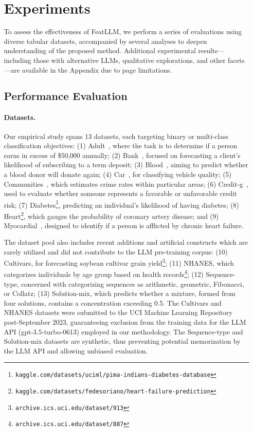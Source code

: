 \section{Experiments}
To assess the effectiveness of \textsf{FeatLLM}, we perform a series of evaluations using diverse tabular datasets, accompanied by several analyses to deepen understanding of the proposed method. Additional experimental results—including those with alternative LLMs, qualitative explorations, and other facets—are available in the Appendix due to page limitations.

\subsection{Performance Evaluation}
\paragraph{Datasets.}
Our empirical study spans 13 datasets, each targeting binary or multi-class classification objectives: (1) Adult~\cite{asuncion2007uci}, where the task is to determine if a person earns in excess of \$50,000 annually; (2) Bank~\cite{moro2014data}, focused on forecasting a client’s likelihood of subscribing to a term deposit; (3) Blood~\cite{yeh2009knowledge}, aiming to predict whether a blood donor will donate again; (4) Car~\cite{kadra2021well}, for classifying vehicle quality; (5) Communities~\cite{misc_communities_and_crime_183}, which estimates crime rates within particular areas; (6) Credit-g~\cite{kadra2021well}, used to evaluate whether someone represents a favorable or unfavorable credit risk; (7) Diabetes\footnote{\texttt{kaggle.com/datasets/uciml/pima-indians-diabetes-database}}, predicting an individual’s likelihood of having diabetes; (8) Heart\footnote{\texttt{kaggle.com/datasets/fedesoriano/heart-failure-prediction}}, which gauges the probability of coronary artery disease; and (9) Myocardial~\cite{misc_myocardial_infarction_complications_579}, designed to identify if a person is afflicted by chronic heart failure.

The dataset pool also includes recent additions and artificial constructs which are rarely utilized and did not contribute to the LLM pre-training corpus: (10) Cultivars, for forecasting soybean cultivar grain yield\footnote{\texttt{archive.ics.uci.edu/dataset/913}}; (11) NHANES, which categorizes individuals by age group based on health records\footnote{\texttt{archive.ics.uci.edu/dataset/887}}; (12) Sequence-type, concerned with categorizing sequences as arithmetic, geometric, Fibonacci, or Collatz; (13) Solution-mix, which predicts whether a mixture, formed from four solutions, contains a concentration exceeding 0.5. The Cultivars and NHANES datasets were submitted to the UCI Machine Learning Repository post-September 2023, guaranteeing exclusion from the training data for the LLM API (gpt-3.5-turbo-0613) employed in our methodology. The Sequence-type and Solution-mix datasets are synthetic, thus preventing potential memorization by the LLM API and allowing unbiased evaluation.

